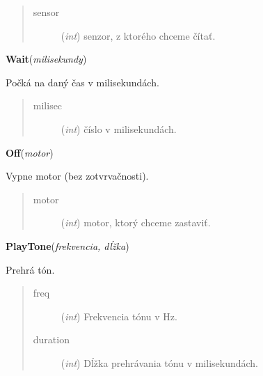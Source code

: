 \documentclass[10pt,a4paper]{article}
\begin{document}
    

\begin{quote}
    \begin{description}
        
\item[sensor] ({\emph{int}}) senzor, z ktorého chceme čítať.

    \end{description}
\end{quote}

 

\vspace{6pt}
{\bf Wait}({\it milisekundy}) 
    
    Počká na daný čas v milisekundách.


    

\begin{quote}
    \begin{description}
        
\item[milisec] ({\emph{int}}) číslo v milisekundách.

    \end{description}
\end{quote}

 

\vspace{6pt}
{\bf Off}({\it motor}) 
    
    Vypne motor (bez zotvrvačnosti).
    

    

\begin{quote}
    \begin{description}
        
\item[motor] ({\emph{int}}) motor, ktorý chceme zastaviť.

    \end{description}
\end{quote}

 

\vspace{6pt}
{\bf PlayTone}({\it frekvencia, dĺžka}) 
    
    Prehrá tón.



    

\begin{quote}
    \begin{description}
        
\item[freq] ({\emph{int}}) Frekvencia tónu v Hz.

\item[duration] ({\emph{int}}) Dĺžka prehrávania tónu v milisekundách.

    \end{description}
\end{quote}
\end{document}
